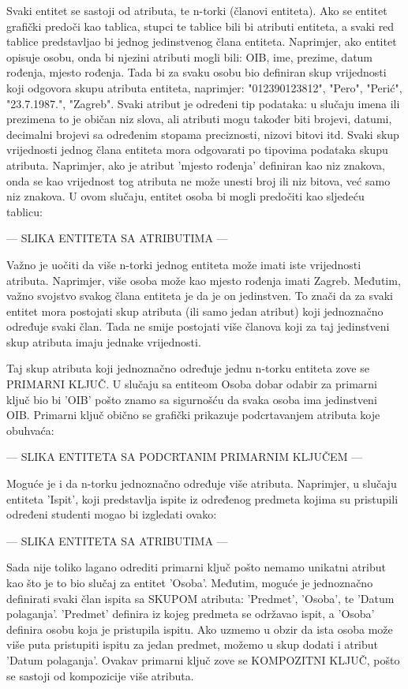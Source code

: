 \documentclass[times, utf8, zavrsni]{fer}
\begin{document}
Svaki entitet se sastoji od atributa, te n-torki (članovi entiteta).
Ako se entitet grafički predoči kao tablica, stupci te tablice bili bi atributi entiteta, a svaki red tablice predstavljao bi jednog jedinstvenog člana entiteta. Naprimjer, ako entitet opisuje osobu, onda bi njezini atributi mogli bili: OIB, ime, prezime, datum rođenja, mjesto rođenja. Tada bi za svaku osobu bio definiran skup vrijednosti koji odgovora skupu atributa entiteta, naprimjer: "012390123812", "Pero", "Perić", "23.7.1987.", "Zagreb". Svaki atribut je određeni tip podataka: u slučaju imena ili prezimena to je običan niz slova, ali atributi mogu također biti brojevi, datumi, decimalni brojevi sa određenim stopama preciznosti, nizovi bitovi itd. Svaki skup vrijednosti jednog člana entiteta mora odgovarati po tipovima podataka skupu atributa. Naprimjer, ako je atribut 'mjesto rođenja' definiran kao niz znakova, onda se kao vrijednost tog atributa ne može unesti broj ili niz bitova, već samo niz znakova. U ovom slučaju, entitet osoba bi mogli predočiti kao sljedeću tablicu:

--- SLIKA ENTITETA SA ATRIBUTIMA ---

Važno je uočiti da više n-torki jednog entiteta može imati iste vrijednosti atributa. Naprimjer, više osoba može kao mjesto rođenja imati Zagreb. Međutim, važno svojstvo svakog člana entiteta je da je on jedinstven. To znači da za svaki entitet mora postojati skup atributa (ili samo jedan atribut) koji jednoznačno određuje svaki član. Tada ne smije postojati više članova koji za taj jedinstveni skup atributa imaju jednake vrijednosti.

Taj skup atributa koji jednoznačno određuje jednu n-torku entiteta zove se PRIMARNI KLJUČ. U slučaju sa entiteom Osoba dobar odabir za primarni ključ bio bi 'OIB' pošto znamo sa sigurnošću da svaka osoba ima jedinstveni OIB. Primarni ključ obično se grafički prikazuje podcrtavanjem atributa koje obuhvaća:

--- SLIKA ENTITETA SA PODCRTANIM PRIMARNIM KLJUČEM ---

Moguće je i da n-torku jednoznačno određuje više atributa. Naprimjer, u slučaju entiteta 'Ispit', koji predstavlja ispite iz određenog predmeta kojima su pristupili određeni studenti mogao bi izgledati ovako:

--- SLIKA ENTITETA SA ATRIBUTIMA ---

Sada nije toliko lagano odrediti primarni ključ pošto nemamo unikatni atribut kao što je to bio slučaj za entitet 'Osoba'. Međutim, moguće je jednoznačno definirati svaki član ispita sa SKUPOM atributa: 'Predmet', 'Osoba', te 'Datum polaganja'. 'Predmet' definira iz kojeg predmeta se održavao ispit, a 'Osoba' definira osobu koja je pristupila ispitu. Ako uzmemo u obzir da ista osoba može više puta pristupiti ispitu za jedan predmet, možemo u skup dodati i atribut 'Datum polaganja'. Ovakav primarni ključ zove se KOMPOZITNI KLJUČ, pošto se sastoji od kompozicije više atributa.
\end{document}
